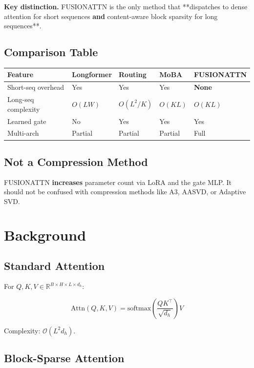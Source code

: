 \textbf{Key distinction.} FUSIONATTN is the only method that **dispatches to 
dense attention for short sequences\textbf{ and }content-aware block sparsity 
for long sequences**.

\subsection{Comparison Table}

\begin{table}[H]
\centering
\small
\begin{tabular}{lllll}
\toprule
\textbf{Feature} & \textbf{Longformer} & \textbf{Routing} & \textbf{MoBA} & \textbf{FUSIONATTN} \\
\midrule
Short-seq overhead & Yes & Yes & Yes & \textbf{None} \\
Long-seq complexity & $O(LW)$ & $O(L^2/K)$ & $O(KL)$ & $O(KL)$ \\
Learned gate & No & Yes & Yes & Yes \\
Multi-arch & Partial & Partial & Partial & Full \\
\bottomrule
\end{tabular}
\end{table}

\subsection{Not a Compression Method}

FUSIONATTN \textbf{increases} parameter count via LoRA and the gate MLP. It 
should not be confused with compression methods like A3, AASVD, or 
Adaptive SVD.



\section{Background}

\subsection{Standard Attention}

For $Q, K, V \in \mathbb{R}^{B \times H \times L \times d_h}$:

\[
\text{Attn}(Q, K, V) = \text{softmax}\!\left(\frac{Q K^\top}{\sqrt{d_h}}\right) V
\tag{3.1}
\]

Complexity: $\mathcal{O}(L^2 d_h)$.

\subsection{Block-Sparse Attention}

